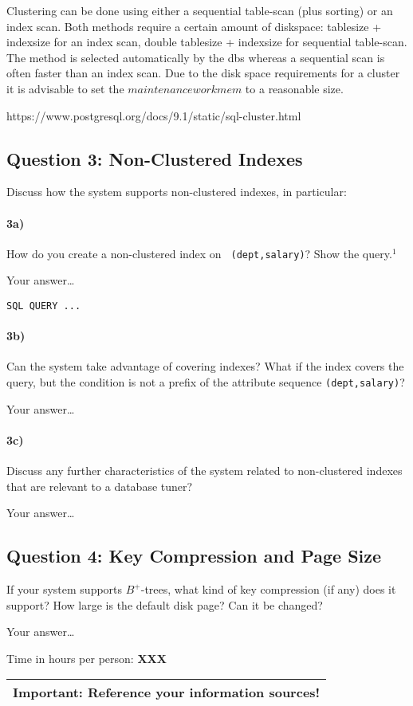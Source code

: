 \documentclass[11pt]{scrartcl}
\begin{document}
Clustering can be done using either a sequential table-scan (plus sorting) or an index scan. Both methods require a certain amount of diskspace: tablesize + indexsize for an index scan, double tablesize + indexsize for sequential table-scan.
The method is selected automatically by the dbs whereas a sequential scan is often faster than an index scan. Due to the disk space requirements for a cluster it is advisable to set the $maintenance work mem$ to a reasonable size.

https://www.postgresql.org/docs/9.1/static/sql-cluster.html

\subsection*{Question 3: Non-Clustered Indexes}

Discuss how the system supports non-clustered indexes, in
particular:

\paragraph{3a)} How do you create a non-clustered index on {\tt
  (dept,salary)}? Show the query.$^1$

\smallskip

Your answer\dots

{\small
\begin{verbatim}
SQL QUERY ...
\end{verbatim}
}

\paragraph{3b)} Can the system take advantage of covering indexes? What if the
index covers the query, but the condition is not a prefix of the
attribute sequence {\tt (dept,salary)}?


\smallskip

Your answer\dots

\paragraph{3c)} Discuss any further characteristics of the system related to
non-clustered indexes that are relevant to a database tuner?

\smallskip

Your answer\dots

\subsection*{Question 4: Key Compression and Page Size} If your system
supports $B^+$-trees, what kind of key compression (if any) does it
support?  How large is the default disk page? Can it be changed?


\smallskip

Your answer\dots


\bigskip

\noindent Time in hours per person: {\bf XXX}

\bigskip

\begin{center}
  \begin{tabular}{c}
    \hline
    {\bf Important:} Reference your information sources!
    \\\hline
  \end{tabular}
\end{center}
\end{document}
